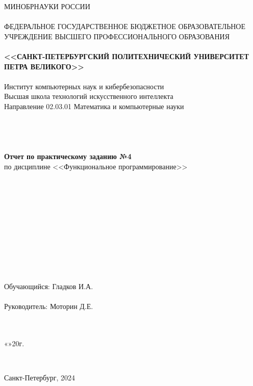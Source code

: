 \documentclass[10pt,a4paper,final]{article} %
\begin{document}
\thispagestyle{empty}

\begin{center}
	{\Large МИНОБРНАУКИ РОССИИ}\\
	~\\
	{\large ФЕДЕРАЛЬНОЕ ГОСУДАРСТВЕННОЕ БЮДЖЕТНОЕ ОБРАЗОВАТЕЛЬНОЕ УЧРЕЖДЕНИЕ ВЫСШЕГО ПРОФЕССИОНАЛЬНОГО ОБРАЗОВАНИЯ}\\
	~\\
	{\Large \bf <<САНКТ-ПЕТЕРБУРГСКИЙ ПОЛИТЕХНИЧЕСКИЙ УНИВЕРСИТЕТ ПЕТРА ВЕЛИКОГО>>}\\
	~\\
	{\large Институт компьютерных наук и кибербезопасности}\\
	{\large Высшая школа технологий искусственного интеллекта}\\
	{\large Направление 02.03.01 Математика и компьютерные науки}\\
	~\\
	~\\
	~\\
	~\\
	{\Large \bf Отчет по практическому заданию №4}\\
	{\Large по дисциплине <<Функциональное программирование>> }\\
	~\\
	~\\
	
	
	~\\
	~\\
	~\\
	~\\
	~\\
	~\\
	~\\
	~\\
	~\\
	{\large Обучающийся: \underline{\hspace{3.5cm}} \qquad\qquad Гладков И.А.}\\
	~\\
	{\large Руководитель: \underline{\hspace{3.5cm}} \hspace{15mm} Моторин Д.Е.}\\
	~\\
	~\\
\end{center}
\begin{flushright}
	
	«\underline{\hspace{1cm}}»\underline{\hspace{3cm}}20\underline{\hspace{0.7cm}}г.
\end{flushright}
~\\
\begin{center}
	{\large Санкт-Петербург, 2024}
\end{center}
\newpage
\end{document}
